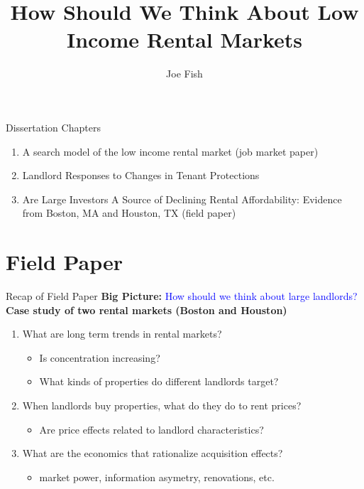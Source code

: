\documentclass[10pt, xcolor=dvipsnames]{beamer}
\date{}
\title[Joe Fish Prospectus]{How Should We Think About Low Income Rental Markets} %
\author[Joe Fish]{Joe Fish}
\begin{document}
\begin{frame}
\titlepage %
\end{frame}

\begin{frame}{Dissertation Chapters}
    \begin{enumerate}
        \item A search model of the low income rental market (job market paper)
        \item Landlord Responses to Changes in Tenant Protections
        \item Are Large Investors A Source of Declining Rental Affordability: Evidence from Boston, MA and Houston, TX (field paper)
    \end{enumerate}
    
\end{frame}

\section{Field Paper}

\begin{frame}{Recap of Field Paper}
    \textbf{Big Picture:} \textcolor{blue}{How should we think about large landlords?}\\
    \pause
    \vspace{0.5cm}
    \textbf{Case study of two rental markets (Boston and Houston)}
    \begin{enumerate}
        \item What are long term trends in rental markets?
        \begin{itemize}
            \item Is concentration increasing?
            \item What kinds of properties do different landlords target?
        \end{itemize}
        \pause
        \item When landlords buy properties, what do they do to rent prices? 
        \begin{itemize}
            \item Are price effects related to landlord characteristics?
        \end{itemize}
        \pause
        \item What are the economics that rationalize acquisition effects?
        \begin{itemize}
            \item market power, information asymetry, renovations, etc.
        \end{itemize}
    \end{enumerate}
\end{frame}
\end{document}
